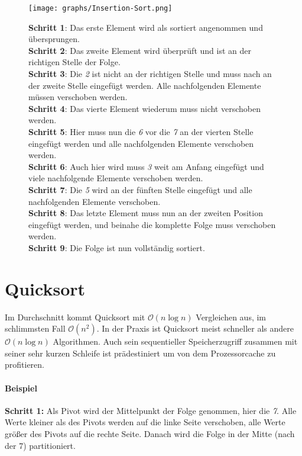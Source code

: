 \documentclass[12pt, a4paper, titlepage, hidelinks]{scrreprt}
\begin{document}
\clearpage

\begin{SCfigure}
  \centering
  \texttt{[image: graphs/Insertion-Sort.png]}
  \caption*{\textbf{Schritt 1}: Das erste Element wird als sortiert angenommen und übersprungen. \\[45pt] %
  	\textbf{Schritt 2}: Das zweite Element wird überprüft und ist an der richtigen Stelle der Folge. \\[40pt] %
  	\textbf{Schritt 3}: Die \textit{2} ist nicht an der richtigen Stelle und muss nach an der zweite Stelle eingefügt werden. Alle nachfolgenden Elemente müssen verschoben werden. \\[15pt] %
  	\textbf{Schritt 4}: Das vierte Element wiederum muss nicht verschoben werden. \\[42pt] %
  	\textbf{Schritt 5}: Hier muss nun die \textit{6} vor die \textit{7} an der vierten Stelle eingefügt werden und alle nachfolgenden Elemente verschoben werden. \\[28pt] %
  	\textbf{Schritt 6}: Auch hier wird muss \textit{3} weit am Anfang eingefügt und viele nachfolgende Elemente verschoben werden.\\[32pt] %
  	\textbf{Schritt 7}: Die \textit{5} wird an der fünften Stelle eingefügt und alle nachfolgenden Elemente verschoben. \\[26pt] %
  	\textbf{Schritt 8}: Das letzte Element muss nun an der zweiten Position eingefügt werden, und beinahe die komplette Folge muss verschoben werden. \\[16pt] %
  	\textbf{Schritt 9}: Die Folge ist nun vollständig sortiert.
  }
\end{SCfigure}
\clearpage
\section{Quicksort}

Im Durchschnitt kommt Quicksort mit $\mathcal{O}(n\log{}n)$ Vergleichen aus, im schlimmsten Fall $\mathcal{O}(n^2)$. In der Praxis ist Quicksort meist schneller als andere $\mathcal{O}(n\log{}n)$ Algorithmen. Auch sein sequentieller Speicherzugriff zusammen mit seiner sehr kurzen Schleife ist prädestiniert um von dem Prozessorcache zu profitieren.

\paragraph{Beispiel} 
\textbf{Schritt 1:} Als Pivot wird der Mittelpunkt der Folge genommen, hier die \textit{7}. Alle Werte kleiner als des Pivots werden auf die linke Seite verschoben, alle Werte größer des Pivots auf die rechte Seite. Danach wird die Folge in der Mitte (nach der 7) partitioniert.
\end{document}
